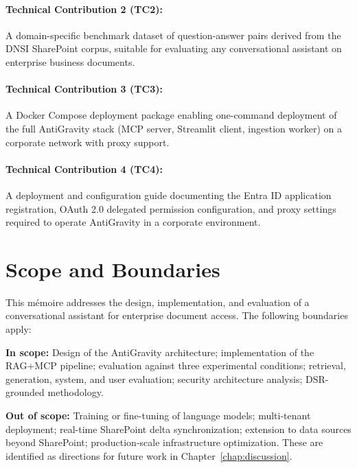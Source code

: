 \paragraph{Technical Contribution 2 (TC2):} A domain-specific benchmark dataset of question-answer pairs derived from the DNSI SharePoint corpus, suitable for evaluating any conversational assistant on enterprise business documents.

\paragraph{Technical Contribution 3 (TC3):} A Docker Compose deployment package enabling one-command deployment of the full AntiGravity stack (MCP server, Streamlit client, ingestion worker) on a corporate network with proxy support.

\paragraph{Technical Contribution 4 (TC4):} A deployment and configuration guide documenting the Entra ID application registration, OAuth 2.0 delegated permission configuration, and proxy settings required to operate AntiGravity in a corporate environment.

\section{Scope and Boundaries}
\label{sec:intro-scope}

This mémoire addresses the design, implementation, and evaluation of a conversational assistant for enterprise document access. The following boundaries apply:

\textbf{In scope:} Design of the AntiGravity architecture; implementation of the RAG+MCP pipeline; evaluation against three experimental conditions; retrieval, generation, system, and user evaluation; security architecture analysis; DSR-grounded methodology.

\textbf{Out of scope:} Training or fine-tuning of language models; multi-tenant deployment; real-time SharePoint delta synchronization; extension to data sources beyond SharePoint; production-scale infrastructure optimization. These are identified as directions for future work in Chapter~\ref{chap:discussion}.

